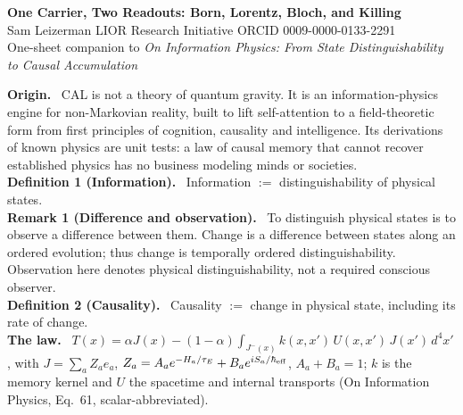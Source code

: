 \documentclass[9pt]{extarticle}
\begin{document}
\begin{center}
{\Large\bfseries\color{ink} One Carrier, Two Readouts: Born, Lorentz, Bloch, and Killing}\\[2pt]
{\small Sam Leizerman \;\textbullet\; LIOR Research Initiative \;\textbullet\; ORCID 0009-0000-0133-2291}\\[1pt]
{\small\color{note} One-sheet companion to \textit{On Information Physics: From State Distinguishability to Causal Accumulation}}
\end{center}
\vspace{-4pt}

\begin{tcolorbox}[colback=ink!4,colframe=ink!60,boxrule=0.5pt,left=5pt,right=5pt,top=3pt,bottom=3pt]
\small
\textbf{Origin.} \ CAL is not a theory of quantum gravity. It is an information-physics engine for non-Markovian reality, built to lift self-attention to a field-theoretic form from first principles of cognition, causality and intelligence. Its derivations of known physics are unit tests: a law of causal memory that cannot recover established physics has no business modeling minds or societies.\\[2pt]
\textbf{Definition 1 (Information).} \ Information $:=$ distinguishability of physical states.\\[2pt]
\textbf{Remark 1 (Difference and observation).} \ To distinguish physical states is to observe a difference between them. Change is a difference between states along an ordered evolution; thus change is temporally ordered distinguishability. Observation here denotes physical distinguishability, not a required conscious observer.\\[2pt]
\textbf{Definition 2 (Causality).} \ Causality $:=$ change in physical state, including its rate of change.\\[2pt]
\textbf{The law.} \ $T(x)=\alpha J(x)-(1-\alpha)\int_{J^-(x)}k(x,x')\,U(x,x')\,J(x')\,d^4x'$, with $J=\sum_a Z_ae_a$, $Z_a=A_ae^{-H_a/\tau_E}+B_ae^{iS_a/\hbar_{\rm eff}}$, $A_a+B_a=1$; $k$ is the memory kernel and $U$ the spacetime and internal transports (On Information Physics, Eq.~61, scalar-abbreviated).
\end{tcolorbox}
\end{document}
